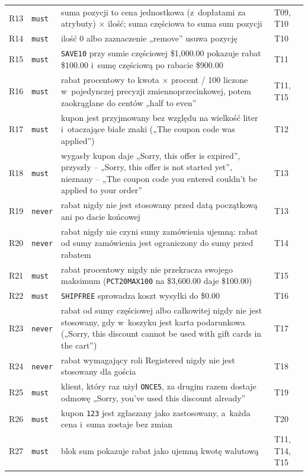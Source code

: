 {\begin{xltabular}{\linewidth}{@{}l l >{\raggedright\arraybackslash}X >{\raggedright\arraybackslash}p{2.2cm}@{}}
R13 & \texttt{must} & suma pozycji to cena jednostkowa (z~dopłatami za atrybuty) × ilość; suma częściowa to suma sum pozycji & T09, T10 \\
R14 & \texttt{must} & ilość 0 albo zaznaczenie „remove” usuwa pozycję & T10 \\
R15 & \texttt{must} & \texttt{SAVE10} przy sumie częściowej \$1,000.00 pokazuje rabat \$100.00 i~sumę częściową po rabacie \$900.00 & T11 \\
R16 & \texttt{must} & rabat procentowy to kwota × procent / 100 liczone w~pojedynczej precyzji zmiennoprzecinkowej, potem zaokrąglane do centów „half to even” & T11, T15 \\
R17 & \texttt{must} & kupon jest przyjmowany bez względu na wielkość liter i~otaczające białe znaki („The coupon code was applied”) & T12 \\
R18 & \texttt{must} & wygasły kupon daje „Sorry, this offer is expired”, przyszły -- „Sorry, this offer is not started yet”, nieznany -- „The coupon code you entered couldn't be applied to your order” & T13 \\
R19 & \texttt{never} & rabat nigdy nie jest stosowany przed datą początkową ani po dacie końcowej & T13 \\
R20 & \texttt{never} & rabat nigdy nie czyni sumy zamówienia ujemną: rabat od sumy zamówienia jest ograniczony do sumy przed rabatem & T14 \\
R21 & \texttt{must} & rabat procentowy nigdy nie przekracza swojego maksimum (\texttt{PCT20MAX100} na \$3,600.00 daje \$100.00) & T15 \\
R22 & \texttt{must} & \texttt{SHIPFREE} sprowadza koszt wysyłki do \$0.00 & T16 \\
R23 & \texttt{never} & rabat od sumy częściowej albo całkowitej nigdy nie jest stosowany, gdy w~koszyku jest karta podarunkowa („Sorry, this discount cannot be used with gift cards in the cart”) & T17 \\
R24 & \texttt{never} & rabat wymagający roli Registered nigdy nie jest stosowany dla gościa & T18 \\
R25 & \texttt{must} & klient, który raz użył \texttt{ONCE5}, za drugim razem dostaje odmowę „Sorry, you've used this discount already” & T19 \\
R26 & \texttt{must} & kupon \texttt{123} jest zgłaszany jako zastosowany, a~każda cena i~suma zostaje bez zmian & T20 \\
R27 & \texttt{must} & blok sum pokazuje rabat jako ujemną kwotę walutową & T11, T14, T15 \\

\end{xltabular}}
